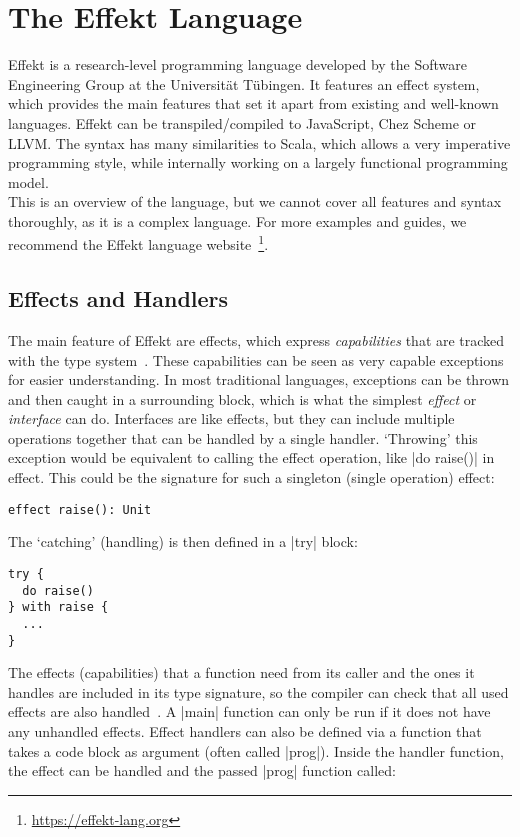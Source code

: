 \chapter{The Effekt Language}\label{chap:effekt}

Effekt is a research-level programming language developed by the Software Engineering Group at the Universität Tübingen. It features an effect system, which provides the main features that set it apart from existing and well-known languages. Effekt can be transpiled/compiled to JavaScript, Chez Scheme or LLVM. The syntax has many similarities to Scala, which allows a very imperative programming style, while internally working on a largely functional programming model.\\
This is an overview of the language, but we cannot cover all features and syntax thoroughly, as it is a complex language. For more examples and guides, we recommend the Effekt language website~\footnote{\url{https://effekt-lang.org}}.

\section{Effects and Handlers}

The main feature of Effekt are effects, which express \textit{capabilities} that are tracked with the type system~\cite{brachthauser2020effects}. These capabilities can be seen as very capable exceptions for easier understanding. In most traditional languages, exceptions can be thrown and then caught in a surrounding block, which is what the simplest \textit{effect} or \textit{interface} can do. Interfaces are like effects, but they can include multiple operations together that can be handled by a single handler. `Throwing' this exception would be equivalent to calling the effect operation, like |do raise()| in effect. This could be the signature for such a singleton (single operation) effect:

\begin{lstlisting}
effect raise(): Unit
\end{lstlisting}

The `catching' (handling) is then defined in a |try| block:

\begin{lstlisting}
try {
  do raise()
} with raise {
  ...
}
\end{lstlisting}

The effects (capabilities) that a function need from its caller and the ones it handles are included in its type signature, so the compiler can check that all used effects are also handled~\cite{brachthauser2022effects}. A |main| function can only be run if it does not have any unhandled effects. Effect handlers can also be defined via a function that takes a code block as argument (often called |prog|). Inside the handler function, the effect can be handled and the passed |prog| function called:

